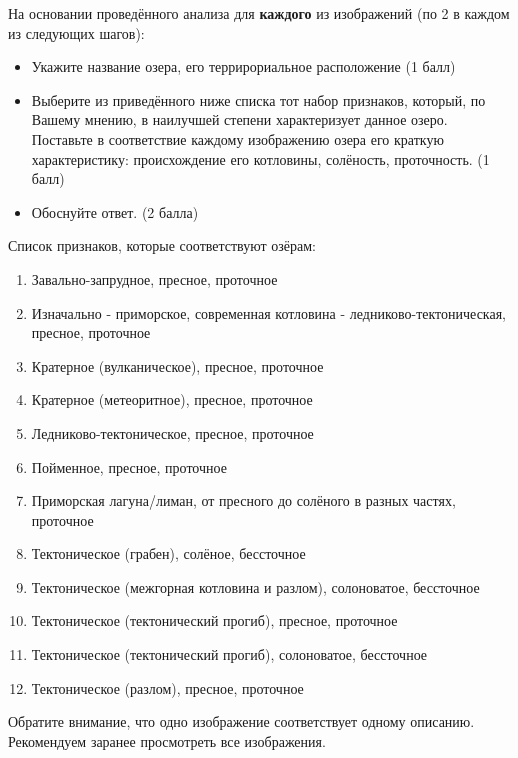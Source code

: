 
На основании проведённого анализа для \textbf{каждого} из изображений (по 2 в каждом из следующих шагов):
\begin{itemize}
    \item Укажите название озера, его террирориальное расположение (1 балл)
    \item Выберите из приведённого ниже списка тот набор признаков, который, по Вашему мнению, в наилучшей степени характеризует данное озеро. Поставьте в соответствие каждому изображению озера его краткую характеристику: происхождение его котловины, солёность, проточность. (1 балл)
    \item Обоснуйте ответ. (2 балла)
\end{itemize}

Список признаков, которые соответствуют озёрам:
\begin{enumerate}
    \item Завально-запрудное, пресное, проточное
    \item Изначально - приморское, современная котловина - ледниково-тектоническая, пресное, проточное
    \item Кратерное (вулканическое), пресное, проточное
    \item Кратерное (метеоритное), пресное, проточное
    \item Ледниково-тектоническое, пресное, проточное
    \item Пойменное, пресное, проточное
    \item Приморская лагуна/лиман, от пресного до солёного в разных частях, проточное
    \item Тектоническое (грабен), солёное, бессточное
    \item Тектоническое (межгорная котловина и разлом), солоноватое, бессточное
    \item Тектоническое (тектонический прогиб), пресное, проточное
    \item Тектоническое (тектонический прогиб), солоноватое, бессточное
    \item Тектоническое (разлом), пресное, проточное
\end{enumerate}

Обратите внимание, что одно изображение соответствует одному описанию. Рекомендуем заранее просмотреть все изображения.

